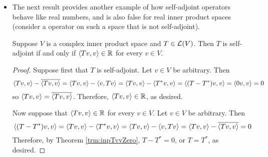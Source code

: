 \documentclass[../main.tex]{subfiles}
\begin{document}
\begin{itemize}
\begin{theorem}
        \begin{proof}
            Let $u\in V$ be arbitrary. By inner product algebra, we have that
            \begin{equation*}
                \inp{Tu}{w} = \frac{\inp{T(u+w)}{u+w}-\inp{T(u-w)}{u-w}}{4}+\frac{\inp{T(u+iw)}{u+iw}-\inp{T(u-iw)}{u-iw}}{4}i
            \end{equation*}
            for all $w\in V$. Since each term on the right-hand side of the above equation is of the form $\inp{Tv}{v}$ and we know by hypothesis that $\inp{Tv}{v}=0$ for all $v\in V$, we have that $\inp{Tu}{w}=0$ for all $w\in V$. In particular, if we let $w=Tu$, we learn that $\inp{Tu}{Tu}=0$, which implies that $Tu=0$. But this implies that $Tu=0$ for all $u\in V$, i.e., that $T=0$.
        \end{proof}
    \end{theorem}
    \item The next result provides another example of how self-adjoint operators behave like real numbers, and is also false for real inner product spaces (consider a operator on such a space that is not self-adjoint).
    \begin{theorem}\label{trm:selfAdjointTvvReal}
        Suppose $V$ is a complex inner product space and $T\in\mathcal{L}(V)$. Then $T$ is self-adjoint if and only if $\left\langle{Tv},{v}\right\rangle\in\mathbb{R}$ for every $v\in V$.
        \begin{proof}
            Suppose first that $T$ is self-adjoint. Let $v\in V$ be arbitrary. Then
            \begin{equation*}
                \left\langle{Tv},{v}\right\rangle-\overline{\left\langle{Tv},{v}\right\rangle} = \left\langle{Tv},{v}\right\rangle-\left\langle{v},{Tv}\right\rangle
                = \left\langle{Tv},{v}\right\rangle-\left\langle{T^*v},{v}\right\rangle
                = \left\langle{(T-T^*)v},{v}\right\rangle
                = \left\langle{0v},{v}\right\rangle
                = 0
            \end{equation*}
            so $\left\langle{Tv},{v}\right\rangle=\overline{\left\langle{Tv},{v}\right\rangle}$. Therefore, $\left\langle{Tv},{v}\right\rangle\in\mathbb{R}$, as desired.\par
            Now suppose that $\left\langle{Tv},{v}\right\rangle\in\mathbb{R}$ for every $v\in V$. Let $v\in V$ be arbitrary. Then
            \begin{equation*}
                \left\langle{(T-T^*)v},{v}\right\rangle = \left\langle{Tv},{v}\right\rangle-\left\langle{T^*v},{v}\right\rangle
                = \left\langle{Tv},{v}\right\rangle-\left\langle{v},{Tv}\right\rangle
                = \left\langle{Tv},{v}\right\rangle-\overline{\left\langle{Tv},{v}\right\rangle}
                = 0
            \end{equation*}
            Therefore, by Theorem \ref{trm:inpTvvZero}, $T-T^*=0$, or $T=T^*$, as desired.
        \end{proof}

\end{theorem}
\end{itemize}
\end{document}
